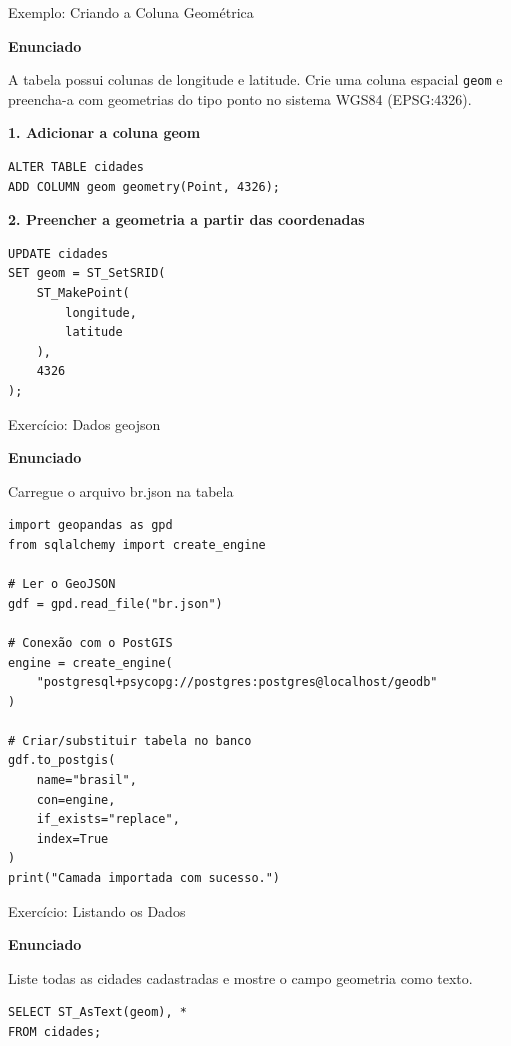 \documentclass{beamer}
\begin{document}
\begin{frame}[fragile]{Exemplo: Criando a Coluna Geométrica}

\textbf{Enunciado}

A tabela possui colunas de longitude e latitude. Crie uma coluna espacial \texttt{geom} e preencha-a com geometrias do tipo ponto no sistema WGS84 (EPSG:4326).

\vspace{0.3cm}

\textbf{1. Adicionar a coluna geom}

\begin{verbatim}
ALTER TABLE cidades
ADD COLUMN geom geometry(Point, 4326);
\end{verbatim}

\vspace{0.2cm}

\textbf{2. Preencher a geometria a partir das coordenadas}

\begin{verbatim}
UPDATE cidades
SET geom = ST_SetSRID(
    ST_MakePoint(
        longitude,
        latitude
    ),
    4326
);
\end{verbatim}

\end{frame}

\begin{frame}[fragile]{Exercício: Dados geojson}

\textbf{Enunciado}

Carregue o arquivo br.json na tabela 
\pause
\begin{verbatim}
import geopandas as gpd
from sqlalchemy import create_engine

# Ler o GeoJSON
gdf = gpd.read_file("br.json")

# Conexão com o PostGIS
engine = create_engine(
    "postgresql+psycopg://postgres:postgres@localhost/geodb"
)

# Criar/substituir tabela no banco
gdf.to_postgis(
    name="brasil",
    con=engine,
    if_exists="replace",
    index=True
)
print("Camada importada com sucesso.")
\end{verbatim}

\end{frame}

\begin{frame}[fragile]{Exercício: Listando os Dados}

\textbf{Enunciado}

Liste todas as cidades cadastradas e mostre o campo geometria como texto.
\pause
\begin{verbatim}
SELECT ST_AsText(geom), *
FROM cidades;
\end{verbatim}

\end{frame}
\end{document}
